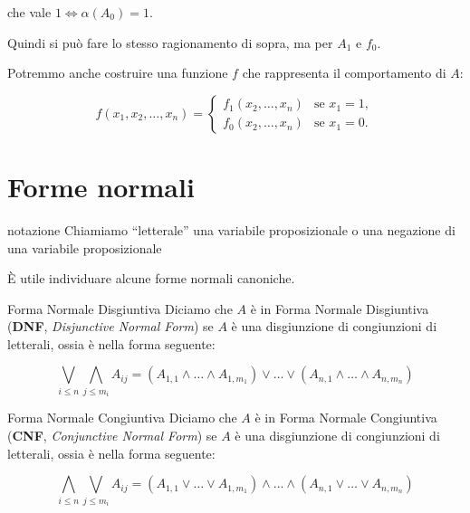 \documentclass[a4paper,11pt]{report}
\begin{document}
\begin{proofframe}[title=dimostrazione]
\begin{itemize}
\begin{itemize}
            che vale \( 1 \iff \alpha(A_0)=1\).

            Quindi si può fare lo stesso ragionamento di sopra, ma per \( A_1 \) e \( f_0 \).

            \begin{gframe}{}
                Potremmo anche costruire una funzione \( f \) che rappresenta il comportamento di \( A \):

                \[ f(x_1, x_2, \ldots, x_n) =
                    \begin{cases}
                        f_1(x_2, \ldots, x_n) & \text{se } x_1 = 1, \\
                        f_0(x_2, \ldots, x_n) & \text{se } x_1 = 0.
                    \end{cases}
                \]
            \end{gframe}

    \end{itemize}

\end{itemize}

\end{proofframe}

\section{Forme normali}

\begin{gframe}{notazione}
    Chiamiamo ``letterale'' una variabile proposizionale o una negazione di una variabile proposizionale
\end{gframe}

È utile individuare alcune forme normali canoniche.

\begin{defframe}{Forma Normale Disgiuntiva}{}
    Diciamo che \( A \) è in Forma Normale Disgiuntiva (\textbf{DNF}, \textit{Disjunctive Normal Form}) se \( A \) è una disgiunzione di congiunzioni di letterali, ossia è nella forma seguente:

    \[ \bigvee_{i\leq n} \bigwedge_{j\leq m_i} A_{ij} = (A_{1,1} \land \dots \land A_{1, m_1}) \lor \dots \lor (A_{n,1} \land \dots \land A_{n, m_n}) \]

\end{defframe}

\begin{defframe}{Forma Normale Congiuntiva}{}
    Diciamo che \( A \) è in Forma Normale Congiuntiva (\textbf{CNF}, \textit{Conjunctive Normal Form}) se \( A \) è una disgiunzione di congiunzioni di letterali, ossia è nella forma seguente:

    \[ \bigwedge_{i\leq n} \bigvee_{j\leq m_i} A_{ij} = (A_{1,1} \lor \dots \lor A_{1, m_1}) \land \dots \land (A_{n,1} \lor \dots \lor A_{n, m_n}) \]

\end{defframe}
\end{document}
